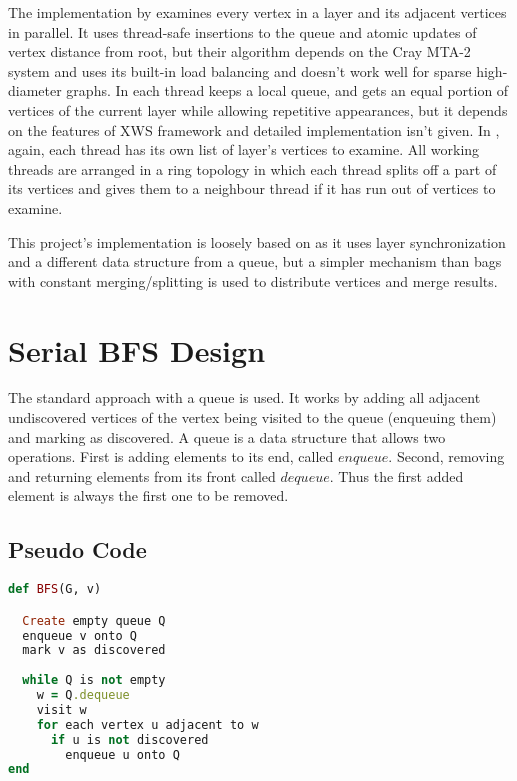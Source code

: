 \documentclass{report}
\theoremstyle{plain}
\theoremstyle{definition}
\theoremstyle{remark}
\begin{document}
The implementation by \cite{bader2006designing} examines every vertex in a layer and its adjacent vertices in parallel. It uses thread-safe insertions to the queue and atomic updates of vertex distance from root, but their algorithm depends on the Cray MTA-2 system and uses its built-in load balancing and doesn't work well for sparse high-diameter graphs.
In \cite{cong2008solving} each thread keeps a local queue, and gets an equal portion of vertices of the current layer while allowing repetitive appearances, but it depends on the features of XWS framework and detailed implementation isn't given.
In \cite{zhang2006parallel}, again, each thread has its own list of layer's vertices to examine. All working threads are arranged in a ring topology in which each thread splits off a part of its vertices and gives them to a neighbour thread if it has run out of vertices to examine.

This project's implementation is loosely based on \cite{Leiserson} as it uses layer synchronization and a different data structure from a queue, but a simpler mechanism than bags with constant merging/splitting is used to distribute vertices and merge results.

\section{Serial BFS Design}
 
The standard approach with a queue is used. It works by adding all adjacent undiscovered vertices of the vertex being visited to the queue (enqueuing them) and marking as discovered. A queue is a data structure that allows two operations. First is adding elements to its end, called $enqueue$. Second, removing and returning elements from its front called $dequeue$. Thus the first added element is always the first one to be removed.

\subsection*{Pseudo Code}

\begin{lstlisting}[language=Ruby]
def BFS(G, v)

  Create empty queue Q
  enqueue v onto Q
  mark v as discovered
  
  while Q is not empty
    w = Q.dequeue
    visit w
    for each vertex u adjacent to w
      if u is not discovered
        enqueue u onto Q
end
\end{lstlisting}
\end{document}
